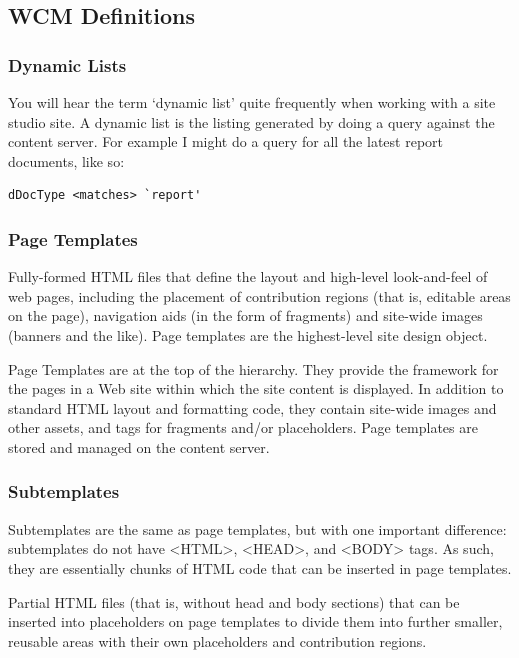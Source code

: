 \subsection{WCM Definitions}


\subsubsection{Dynamic Lists}

You will hear the term `dynamic list' quite frequently when working
with a site studio site.  A dynamic list is the listing generated by
doing a query against the content server.  For example I might do a
query for all the latest report documents, like so:

\begin{verbatim}
dDocType <matches> `report'
\end{verbatim}

\subsubsection{Page Templates}

Fully-formed HTML files that define the layout and high-level
look-and-feel of web pages, including the placement of contribution
regions (that is, editable areas on the page), navigation aids (in the
form of fragments) and site-wide images (banners and the like). Page
templates are the highest-level site design object.

Page Templates are at the top of the hierarchy. They provide the
framework for the pages in a Web site within which the site content is
displayed. In addition to standard HTML layout and formatting code,
they contain site-wide images and other assets, and tags for fragments
and/or placeholders. Page templates are stored and managed on the
content server.

\subsubsection{Subtemplates}

Subtemplates are the same as page templates, but with one important
difference: subtemplates do not have <HTML>, <HEAD>, and <BODY>
tags. As such, they are essentially chunks of HTML code that can be
inserted in page templates.

Partial HTML files (that is, without head and body sections) that can
be inserted into placeholders on page templates to divide them into
further smaller, reusable areas with their own placeholders and
contribution regions.

